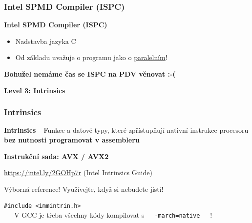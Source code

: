 \documentclass[usenames,dvipsnames,9pt]{beamer}
\begin{document}
\begin{frame}
  \frametitle{Intel SPMD Compiler (ISPC)}

  \textbf{Intel SPMD Compiler (ISPC)}
  \begin{itemize}
    \item Nadstavba jazyka C
    \item Od základu uvažuje o programu jako o \underline{paralelním}!
  \end{itemize}

  \vspace{3em}
  \pause
  \begin{center}
    \LARGE\bf Bohužel nemáme čas se ISPC na PDV věnovat :-(
  \end{center}
\end{frame}

\begin{frame}[fragile]
  \begin{center}
    \LARGE\bf Level 3: Intrinsics \hspace{10pt}   
  \end{center}
\end{frame}

\begin{frame}
  \frametitle{Intrinsics}

  {\large \textbf{Intrinsics} -- Funkce a datové typy, které zpřístupňují nativní instrukce procesoru \textbf{bez nutnosti programovat v assembleru}}

  \vspace{1em}

  \hfill{\LARGE\bf Instrukční sada: AVX / AVX2}

  \pause

   \vspace{3em}
   \url{https://intel.ly/2GOHp7r} (Intel Intrinsics Guide)

   \hspace{10pt} Výborná reference! Využívejte, když si nebudete jistí!
\end{frame}

\begin{frame}[standout]
  \texttt{\#include <immintrin.h>} \\[2em]
  \faWarning\ \ \ V GCC je třeba všechny kódy kompilovat s\ \ \  \texttt{-march=native}\ \ \ !
\end{frame}
\end{document}
